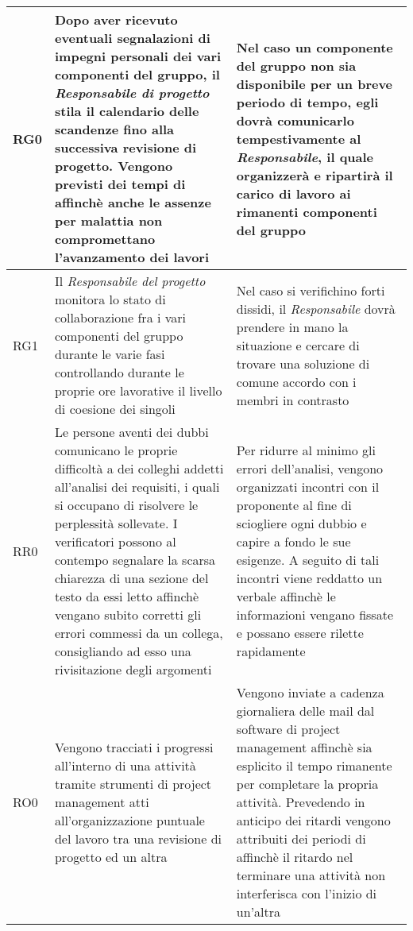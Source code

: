\documentclass[../PianodiProgetto.tex]{subfiles}
\begin{document}
\begin{longtable}{|p{15mm}|p{60mm}|p{60mm}|}
			 RG0& Dopo aver ricevuto eventuali segnalazioni di impegni personali dei vari componenti del gruppo, il \textit{Responsabile di progetto} stila il calendario delle scandenze fino alla successiva revisione di progetto. Vengono previsti dei tempi di \glossario{slack}{Slack} affinchè anche le assenze per malattia non compromettano l'avanzamento dei lavori & Nel caso un componente del gruppo non sia disponibile per un breve periodo di tempo, egli dovrà comunicarlo tempestivamente al \textit{Responsabile}, il quale organizzerà e ripartirà il carico di lavoro ai rimanenti componenti del gruppo\\ \hline
			 RG1& Il \textit{Responsabile del progetto} monitora lo stato di collaborazione fra i vari componenti del gruppo durante le varie fasi controllando durante le proprie ore lavorative il livello di coesione dei singoli & Nel caso si verifichino forti dissidi, il \textit{Responsabile} dovrà prendere in mano la situazione e cercare di trovare una soluzione di comune accordo con i membri in contrasto\\ \hline
			  \newpage
			 \hline RR0& Le persone aventi dei dubbi comunicano le proprie difficoltà a dei colleghi addetti all'analisi dei requisiti, i quali si occupano di risolvere le perplessità sollevate. I verificatori possono al contempo segnalare la scarsa chiarezza di una sezione del testo da essi letto affinchè vengano subito corretti gli errori commessi da un collega, consigliando ad esso una rivisitazione degli argomenti & Per ridurre al minimo gli errori dell'analisi, vengono organizzati incontri con il proponente al fine di sciogliere ogni dubbio e capire a fondo le sue esigenze. A seguito di tali incontri viene reddatto un verbale affinchè le informazioni vengano fissate e possano essere rilette rapidamente\\ \hline
			 RO0& Vengono tracciati i progressi all'interno di una attività tramite strumenti di project management atti all'organizzazione puntuale del lavoro tra una revisione di progetto ed un altra & Vengono inviate a cadenza giornaliera delle mail dal software di project management affinchè sia esplicito il tempo rimanente per completare la propria attività. Prevedendo in anticipo dei ritardi vengono attribuiti dei periodi di \glossario{slack}{Slack} affinchè il ritardo nel terminare una attività non interferisca con l'inizio di un'altra\\ \hline
		\end{longtable}
\end{document}
